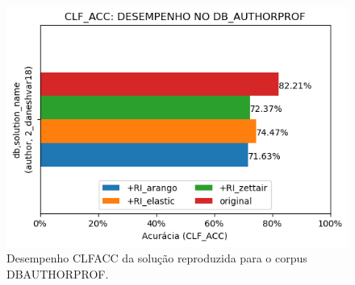 \begin{figure}[ht]
    \centering
    \caption{Desempenho CLF\underscore{}ACC da solução reproduzida para o corpus DB\underscore{}AUTHORPROF.}
    \vspace{-0.5cm}
    \begin{center}
        \includegraphics[scale=0.75]{img/clf-acc-bars-authorprof.png}
    \end{center}
    \vspace{-0.5cm}
    \label{fig:clf-acc-bars-authorprof}
\end{figure}